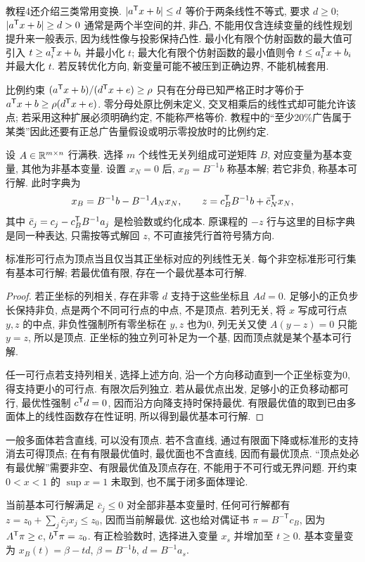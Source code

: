 教程4还介绍三类常用变换. $|a^{\mathsf T} x+b|\le d$ 等价于两条线性不等式, 要求 $d\ge0$; $|a^{\mathsf T} x+b|\ge d>0$ 通常是两个半空间的并, 非凸, 不能用仅含连续变量的线性规划提升来一般表示, 因为线性像与投影保持凸性. 最小化有限个仿射函数的最大值可引入 $t\ge a_i^{\mathsf T} x+b_i$ 并最小化 $t$; 最大化有限个仿射函数的最小值则令 $t\le a_i^{\mathsf T} x+b_i$ 并最大化 $t$. 若反转优化方向, 新变量可能不被压到正确边界, 不能机械套用.

比例约束 $(a^{\mathsf T} x+b)/(d^{\mathsf T} x+e)\ge\rho$ 只有在分母已知严格正时才等价于 $a^{\mathsf T} x+b\ge\rho(d^{\mathsf T} x+e)$. 零分母处原比例未定义, 交叉相乘后的线性式却可能允许该点; 若采用这种扩展必须明确约定, 不能称严格等价. 教程中的“至少20\%广告属于某类”因此还要有正总广告量假设或明示零投放时的比例约定.

设 $A\in\mathbb R^{m\times n}$ 行满秩. 选择 $m$ 个线性无关列组成可逆矩阵 $B$, 对应变量为基本变量, 其他为非基本变量. 设置 $x_N=0$ 后, $x_B=B^{-1}b$ 称基本解; 若它非负, 称基本可行解. 此时字典为
\[
x_B=B^{-1}b-B^{-1}A_Nx_N,\qquad
z=c_B^{\mathsf T} B^{-1}b+\bar c_N^{\mathsf T} x_N,
\]
其中 $\bar c_j=c_j-c_B^{\mathsf T} B^{-1}a_j$ 是检验数或约化成本. 原课程的 $-z$ 行与这里的目标字典是同一种表达, 只需按等式解回 $z$, 不可直接凭行首符号猜方向.

\begin{theorem}
标准形可行点为顶点当且仅当其正坐标对应的列线性无关. 每个非空标准形可行集有基本可行解; 若最优值有限, 存在一个最优基本可行解.
\end{theorem}
\begin{proof}
若正坐标的列相关, 存在非零 $d$ 支持于这些坐标且 $Ad=0$. 足够小的正负步长保持非负, 点是两个不同可行点的中点, 不是顶点. 若列无关, 将 $x$ 写成可行点 $y,z$ 的中点, 非负性强制所有零坐标在 $y,z$ 也为0, 列无关又使 $A(y-z)=0$ 只能 $y=z$, 所以是顶点. 正坐标的独立列可补足为一个基, 因而顶点就是某个基本可行解.

任一可行点若支持列相关, 选择上述方向, 沿一个方向移动直到一个正坐标变为0, 得支持更小的可行点. 有限次后列独立. 若从最优点出发, 足够小的正负移动都可行, 最优性强制 $c^{\mathsf T} d=0$, 因而沿方向降支持时保持最优. 有限最优值的取到已由多面体上的线性函数存在性证明, 所以得到最优基本可行解.
\end{proof}
一般多面体若含直线, 可以没有顶点. 若不含直线, 通过有限面下降或标准形的支持消去可得顶点; 在有有限最优值时, 最优面也不含直线, 因而有最优顶点. “顶点处必有最优解”需要非空、有限最优值及顶点存在, 不能用于不可行或无界问题. 开约束 $0<x<1$ 的 $\sup x=1$ 未取到, 也不属于闭多面体理论.

当前基本可行解满足 $\bar c_j\le0$ 对全部非基本变量时, 任何可行解都有 $z=z_0+\sum_j\bar c_jx_j\le z_0$, 因而当前解最优. 这也给对偶证书 $\pi=B^{-\mathsf T}c_B$, 因为 $A^{\mathsf T}\pi\ge c$, $b^{\mathsf T}\pi=z_0$. 有正检验数时, 选择进入变量 $x_s$ 并增加至 $t\ge0$. 基本变量变为 $x_B(t)=\beta-t d$, $\beta=B^{-1}b$, $d=B^{-1}a_s$.

